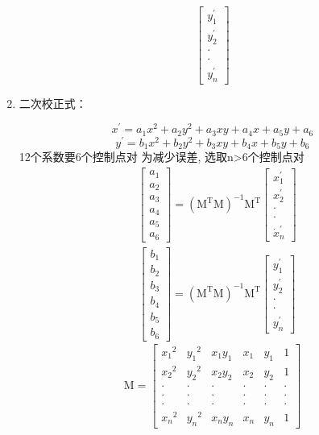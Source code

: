 \documentclass{ctexart}
\begin{document}
\begin{enumerate}
$$              \left[\begin{array}{c}y_{1}^{\prime} \\ y_{2}^{\prime} \\ \cdot \\ \cdot \\ y_{n}^{\prime}\end{array}\right]$$
    \item 二次校正式：
    
    $$x^{\prime}=a_{1} x^{2}+a_{2} y^{2}+a_{3} x y+a_{4} x+a_{5} y+a_{6}$$
    $$y^{\prime}=b_{1} x^{2}+b_{2} y^{2}+b_{3} x y+b_{4} x+b_{5} y+b_{6}$$
    12个系数要6个控制点对 为减少误差, 选取n>6个控制点对 
    $$
\begin{aligned}
&{\left[\begin{array}{l}
a_{1} \\
a_{2} \\
a_{3} \\
a_{4} \\
a_{5} \\
a_{6}
\end{array}\right]=\left(\mathrm{M}^{\mathrm{T}} \mathrm{M}\right)^{-1} \mathrm{M}^{\mathrm{T}}\left[\begin{array}{c}
x_{1}^{\prime} \\
x_{2}^{\prime} \\
\cdot \\
\cdot \\
\dot{x}_{n}^{\prime}
\end{array}\right]} \end{aligned}
$$
$$
\begin{aligned}
&{\left[\begin{array}{c}
b_{1} \\
b_{2} \\
b_{3} \\
b_{4} \\
b_{5} \\
b_{6}
\end{array}\right]=\left(
\mathrm{M}^{\mathrm{T}} \mathrm{M}\right)^{-1}\mathrm{M}^{\mathrm{T}} \left[ \begin{array}{l} y_{1}^{\prime}\\
y_{2}^{\prime}\\
\cdot \\
\cdot \\
y_{n}^{\prime}
\end{array}\right]}
\end{aligned}
$$
    $$\mathrm{M}=\left[\begin{array}{cccccc}x_{1}{ }^{2} & y_{1}{ }^{2} & x_{1} y_{1} & x_{1} & y_{1} & 1 \\ x_{2}{ }^{2} & y_{2}{ }^{2} & x_{2} y_{2} & x_{2} & y_{2} & 1 \\ \cdot & \cdot & \cdot & \cdot & \cdot & \cdot \\ \cdot & \cdot & \cdot & \cdot & \cdot & \cdot \\ \cdot & \cdot & \cdot & \cdot & \cdot & \cdot \\ x_{n}{ }^{2} & y_{n}{ }^{2} & x_{n} y_{n} & x_{n} & y_{n} & 1\end{array}\right]$$
\end{enumerate}
\end{document}
